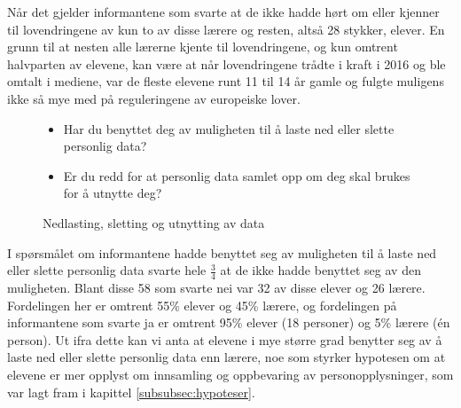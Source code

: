 Når det gjelder informantene som svarte at de ikke hadde hørt om eller kjenner til lovendringene av kun to av disse lærere og resten, altså 28 stykker, elever. En grunn til at nesten alle lærerne kjente til lovendringene, og kun omtrent halvparten av elevene, kan være at når lovendringene trådte i kraft i 2016 og ble omtalt i mediene, var de fleste elevene runt 11 til 14 år gamle og fulgte muligens ikke så mye med på reguleringene av europeiske lover. 

\begin{figure}[H]
    \centering
    \begin{itemize}
        \item Har du benyttet deg av muligheten til å laste ned eller slette personlig data?
        \item Er du redd for at personlig data samlet opp om deg skal brukes for å utnytte deg?
    \end{itemize}
    \caption{Nedlasting, sletting og utnytting av data}
\end{figure}
I spørsmålet om informantene hadde benyttet seg av muligheten til å laste ned eller slette personlig data svarte hele $\frac{3}{4}$ at de ikke hadde benyttet seg av den muligheten. Blant disse 58 som svarte nei var 32 av disse elever og 26 lærere. Fordelingen her er omtrent 55\% elever og 45\% lærere, og fordelingen på informantene som svarte ja er omtrent 95\% elever (18 personer) og 5\% lærere (én person). Ut ifra dette kan vi anta at elevene i mye større grad benytter seg av å laste ned eller slette personlig data enn lærere, noe som styrker hypotesen om at elevene er mer opplyst om innsamling og oppbevaring av personopplysninger, som var lagt fram i kapittel \ref{subsubsec:hypoteser}.

